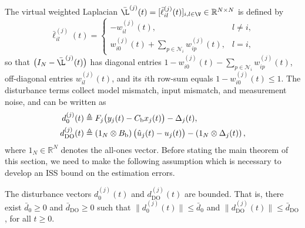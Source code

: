 The virtual weighted Laplacian $\bar{\L}^{(j)}(t)=[\bar{\ell}^{(j)}_{il}(t)]_{i,l\in\V}\in\mathbb{R}^{N\times N}$ is defined by
\begin{equation}\label{eq:def_Lbar}
\bar{\ell}^{(j)}_{il}(t)=
\begin{cases}
-w_{il}^{(j)}(t), & l\neq i,\\[0.5ex]
 w_{i0}^{(j)}(t)+\displaystyle\sum_{p\in\mathcal{N}_i} w_{ip}^{(j)}(t), & l=i,
\end{cases}
\end{equation}
so that $\big(I_N-\bar{\L}^{(j)}(t)\big)$ has diagonal entries $1-w_{i0}^{(j)}(t)-\sum_{p\in\mathcal{N}_i} w_{ip}^{(j)}(t)$, off-diagonal entries $w_{il}^{(j)}(t)$, and its $i$th row-sum equals $1-w_{i0}^{(j)}(t)\le 1$.
The disturbance terms collect model mismatch, input mismatch, and measurement noise, and can be written as
\begin{align}\label{eq:def_disturbances}
d_0^{(j)}(t) &\triangleq F_j\big(y_j(t)-C_{\text{b}}x_j(t)\big)-\Delta_j(t), \notag\\
d_{\mathrm{DO}}^{(j)}(t) &\triangleq \left(1_N\otimes B_{\text{b}}\right)\big(\hat{u}_j(t)-u_j(t)\big)-\left(1_N\otimes \Delta_j(t)\right),
\end{align}
where $1_N\in\mathbb{R}^N$ denotes the all-ones vector.
Before stating the main theorem of this section, we need to make the following assumption which is necessary to develop an ISS bound on the estimation errors.
\begin{assumption}\label{assum_distur}
The disturbance vectors $d_0^{(j)}(t)$ and $d_{\mathrm{DO}}^{(j)}(t)$ are bounded. That is, there exist $\bar{d}_{0} \geq 0$ and $\bar{d}_{\mathrm{DO}} \geq 0$ such that
$\|d_0^{(j)}(t)\| \le \bar{d}_{0}$ and $\| d_{\mathrm{DO}}^{(j)}(t) \| \le \bar{d}_{\mathrm{DO}}$, for all $t\geq 0$.
\end{assumption}

